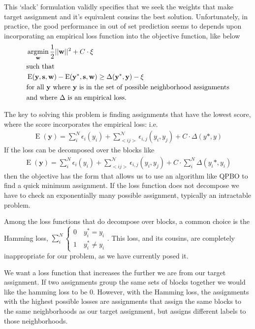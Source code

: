 This `slack' formulation validly specifies that we seek the weights
that make target assignment and it's equivalent cousins the best
solution. Unfortunately, in practice, the good performance in out of
set prediction seems to depends upon incorporating an empirical loss
function into the objective function, like below
%
\begin{align*}
&\operatorname*{\arg\!\min}_{\mathbf{w}} \frac{1}{2}||\mathbf{w}||^2 +
  C\cdot\xi\\
&\text{such that} \\
&\operatorname{E}(\mathbf{y}, \mathbf{s}, \mathbf{w})
- \operatorname{E}(\mathbf{y}^*, \mathbf{s}, \mathbf{w}) \geq \Delta(\mathbf{y}^*, \mathbf{y}) - \xi\\ 
&\text{for all } \mathbf{y} \text{ where } \mathbf{y} \text{ is in the set of
  possible neighborhood assignments}\\
&\text{and where } \Delta \text{ is an empirical loss.}\\
\end{align*}
%

The key to solving this problem is finding assignments that have the
lowest score, where the score incorporates the empirical loss: i.e.
%
\begin{align}
\operatorname{E}(\mathbf{y}) = \sum_i^N\epsilon_i(y_i) + \sum_{<i
  j>}^{\mathcal{N}}\epsilon_{i,j}(y_i,y_j) + C\cdot\Delta(y*, y)
\end{align}
%
If the loss can be decomposed over the blocks like
%
\begin{align}
\operatorname{E}(\mathbf{y}) = \sum_i^N\epsilon_i(y_i) + \sum_{<i
  j>}^{\mathcal{N}}\epsilon_{i,j}(y_i,y_j) + C\cdot\sum_i^N\Delta(y_i*, y_i)
\end{align}
%
then the objective has the form that allows us to use an algorithm
like QPBO to find a quick minimum assignment. If the loss function does not
decompose we have to check an exponentially many possible assignment,
typically an intractable problem.

Among the loss functions that do decompose over blocks, a common
choice is the Hamming loss, $\sum_i^N\begin{cases}
  0 \quad y_i^* = y_i \\
  1 \quad y_i^* \neq y_i
\end{cases}$. This loss, and its cousins, are completely inappropriate
for our problem, as we have currently posed it.

We want a loss function that increases the further we are from our
target assignment. If two assignments group the same sets of blocks
together we would like the hamming loss to be 0. However, with the
Hamming loss, the assignments with the highest possible
losses are assignments that assign the same blocks to the same
neighborhoods as our target assignment, but assigns different labels
to those neighborhoods. 

